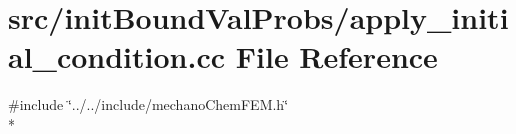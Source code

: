 \section{src/init\-Bound\-Val\-Probs/apply\-\_\-initial\-\_\-condition.cc File Reference}
\label{apply__initial__condition_8cc}
{\ttfamily \#include \char`\"{}../../include/mechano\-Chem\-F\-E\-M.\-h\char`\"{}}\\*

